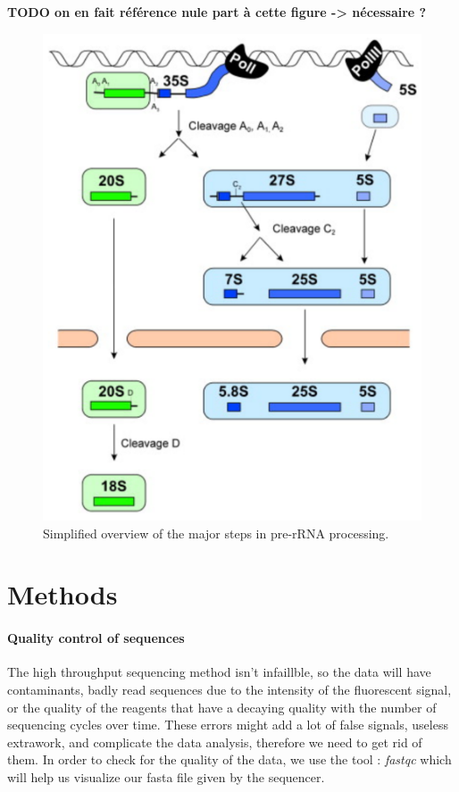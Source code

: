 \documentclass[10pt,a4paper]{article}
\begin{document}
\textbf{TODO on en fait référence nule part à cette figure -> nécessaire ?}
\begin{figure}[h]
	\centering
	\includegraphics[width=0.4\linewidth]{img/tom1Intro}
	\caption{\small Simplified overview of the major steps in pre-rRNA processing.}
	\label{fig:tom1intro}
\end{figure}






\section*{Methods}

\paragraph{Quality control of sequences} The high throughput sequencing method isn’t infaillble, so the data will have contaminants, badly read sequences due to the intensity of the fluorescent signal, or the quality of the reagents that have a decaying quality with the number of sequencing cycles over time\cite{abnizova_computational_2017}. These errors might add a lot of false signals, useless extrawork, and complicate the data analysis, therefore we need to get rid of them. In order to check for the quality of the data, we use the tool : \textit{fastqc}\cite{andrews2012} which will help us visualize our fasta file given by the sequencer. \\
\end{document}
